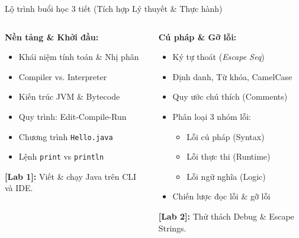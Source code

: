 \documentclass[aspectratio=169, 10pt]{beamer}
\begin{document}
\begin{frame}{Lộ trình buổi học 3 tiết (Tích hợp Lý thuyết \& Thực hành)}
  \begin{columns}[t]
    \begin{tcolorbox}[colback=UniNavy!10,colframe=UniNavy,title=\textbf{TIẾT 1 (50 phút)},fonttitle=\small\bfseries]
      \footnotesize
      \textbf{Nền tảng \& Khởi đầu:}
      \begin{itemize}
        \item Khái niệm tính toán \& Nhị phân
        \item Compiler vs. Interpreter
        \item Kiến trúc JVM \& Bytecode
        \item Quy trình: Edit-Compile-Run
        \item Chương trình \texttt{Hello.java}
        \item Lệnh \texttt{print} vs \texttt{println}
      \end{itemize}
      \vspace{1mm}
      \textbf{\textcolor{UniNavy}{[Lab 1]:}} Viết \& chạy Java trên CLI và IDE.
    \end{tcolorbox}

    \begin{tcolorbox}[colback=UniBlue!10,colframe=UniBlue,title=\textbf{TIẾT 2 (50 phút)},fonttitle=\small\bfseries]
      \footnotesize
      \textbf{Cú pháp \& Gỡ lỗi:}
      \begin{itemize}
        \item Ký tự thoát (\textit{Escape Seq})
        \item Định danh, Từ khóa, CamelCase
        \item Quy ước chú thích (Comments)
        \item Phân loại 3 nhóm lỗi:
          \begin{itemize}\scriptsize
            \item Lỗi cú pháp (Syntax)
            \item Lỗi thực thi (Runtime)
            \item Lỗi ngữ nghĩa (Logic)
          \end{itemize}
        \item Chiến lược đọc lỗi \& gỡ lỗi
      \end{itemize}
      \vspace{1mm}
      \textbf{\textcolor{UniBlue}{[Lab 2]:}} Thử thách Debug \& Escape Strings.
    \end{tcolorbox}


\end{columns}
\end{frame}
\end{document}
